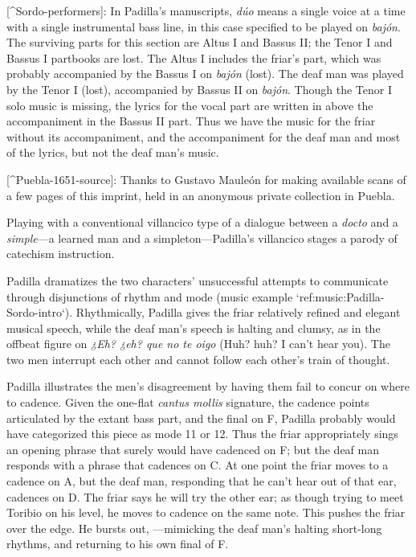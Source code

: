 [^Sordo-performers]:  In Padilla's manuscripts, \emph{dúo} means a single voice at a time with a single instrumental bass line, in this case specified to be played on \emph{bajón}.
The surviving parts for this section are Altus I and Bassus II; the Tenor I and Bassus I partbooks are lost.
The Altus I includes the friar's part, which was probably accompanied by the Bassus I on \emph{bajón} (lost).
The deaf man was played by the Tenor I (lost), accompanied by Bassus II on \emph{bajón}.
Though the Tenor I solo music is missing, the lyrics for the vocal part are written in above the accompaniment in the Bassus II part.
Thus we have the music for the friar without its accompaniment, and the accompaniment for the deaf man and most of the lyrics, but not the deaf man's music.

[^Puebla-1651-source]: Thanks to Gustavo Mauleón for making available scans of a few pages of this imprint, held in an anonymous private collection in Puebla.


Playing with a conventional villancico type of a dialogue between a \emph{docto} and a \emph{simple}---a learned man and a simpleton---Padilla's villancico stages a parody of catechism instruction.

Padilla dramatizes the two characters' unsuccessful attempts to communicate through disjunctions of rhythm and mode  (music example `ref:music:Padilla-Sordo-intro`).
Rhythmically, Padilla gives the friar relatively refined and elegant musical speech, while the deaf man's speech is halting and clumsy, as in the offbeat figure on \emph{¿Eh? ¿eh? que no te oigo} (Huh? huh? I can't hear you).
The two men interrupt each other and cannot follow each other's train of thought.


\label{music:Padilla-Sordo-intro}

Padilla illustrates the men's disagreement by having them fail to concur on where to cadence.
Given the one-flat \emph{cantus mollis} signature, the cadence points articulated by the extant bass part, and the final on F, Padilla probably would have categorized this piece as mode 11 or 12.
\Autocite[873--882; @Judd:RenaissanceModalTheory; @Barnett:TonalOrganization17C]{Cerone:Melopeo}  Thus the friar appropriately sings an opening phrase that surely would have cadenced on F; but the deaf man responds with a phrase that cadences on C.
At one point the friar moves to a cadence on A, but the deaf man, responding that he can't hear out of that ear, cadences on D. The friar says he will try the other ear; as though trying to meet Toribio on his level, he moves to cadence on the same note.
This pushes the friar over the edge.
He bursts out, ---mimicking the deaf man's halting short-long rhythms, and returning to his own final of F.

